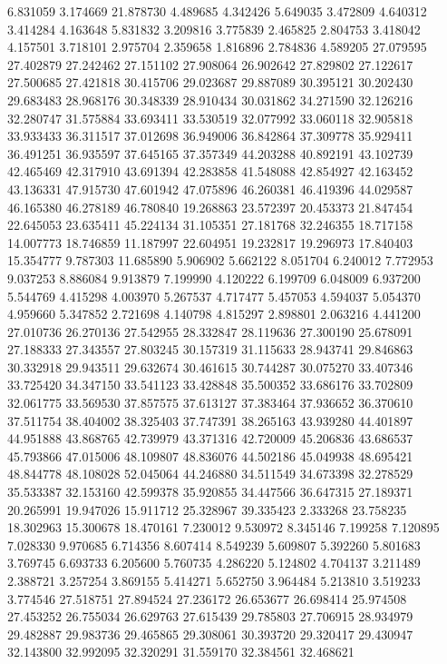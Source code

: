 6.831059
3.174669
21.878730
4.489685
4.342426
5.649035
3.472809
4.640312
3.414284
4.163648
5.831832
3.209816
3.775839
2.465825
2.804753
3.418042
4.157501
3.718101
2.975704
2.359658
1.816896
2.784836
4.589205
27.079595
27.402879
27.242462
27.151102
27.908064
26.902642
27.829802
27.122617
27.500685
27.421818
30.415706
29.023687
29.887089
30.395121
30.202430
29.683483
28.968176
30.348339
28.910434
30.031862
34.271590
32.126216
32.280747
31.575884
33.693411
33.530519
32.077992
33.060118
32.905818
33.933433
36.311517
37.012698
36.949006
36.842864
37.309778
35.929411
36.491251
36.935597
37.645165
37.357349
44.203288
40.892191
43.102739
42.465469
42.317910
43.691394
42.283858
41.548088
42.854927
42.163452
43.136331
47.915730
47.601942
47.075896
46.260381
46.419396
44.029587
46.165380
46.278189
46.780840
19.268863
23.572397
20.453373
21.847454
22.645053
23.635411
45.224134
31.105351
27.181768
32.246355
18.717158
14.007773
18.746859
11.187997
22.604951
19.232817
19.296973
17.840403
15.354777
9.787303
11.685890
5.906902
5.662122
8.051704
6.240012
7.772953
9.037253
8.886084
9.913879
7.199990
4.120222
6.199709
6.048009
6.937200
5.544769
4.415298
4.003970
5.267537
4.717477
5.457053
4.594037
5.054370
4.959660
5.347852
2.721698
4.140798
4.815297
2.898801
2.063216
4.441200
27.010736
26.270136
27.542955
28.332847
28.119636
27.300190
25.678091
27.188333
27.343557
27.803245
30.157319
31.115633
28.943741
29.846863
30.332918
29.943511
29.632674
30.461615
30.744287
30.075270
33.407346
33.725420
34.347150
33.541123
33.428848
35.500352
33.686176
33.702809
32.061775
33.569530
37.857575
37.613127
37.383464
37.936652
36.370610
37.511754
38.404002
38.325403
37.747391
38.265163
43.939280
44.401897
44.951888
43.868765
42.739979
43.371316
42.720009
45.206836
43.686537
45.793866
47.015006
48.109807
48.836076
44.502186
45.049938
48.695421
48.844778
48.108028
52.045064
44.246880
34.511549
34.673398
32.278529
35.533387
32.153160
42.599378
35.920855
34.447566
36.647315
27.189371
20.265991
19.947026
15.911712
25.328967
39.335423
2.333268
23.758235
18.302963
15.300678
18.470161
7.230012
9.530972
8.345146
7.199258
7.120895
7.028330
9.970685
6.714356
8.607414
8.549239
5.609807
5.392260
5.801683
3.769745
6.693733
6.205600
5.760735
4.286220
5.124802
4.704137
3.211489
2.388721
3.257254
3.869155
5.414271
5.652750
3.964484
5.213810
3.519233
3.774546
27.518751
27.894524
27.236172
26.653677
26.698414
25.974508
27.453252
26.755034
26.629763
27.615439
29.785803
27.706915
28.934979
29.482887
29.983736
29.465865
29.308061
30.393720
29.320417
29.430947
32.143800
32.992095
32.320291
31.559170
32.384561
32.468621
